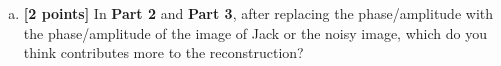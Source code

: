 \documentclass[11pt]{article}
\begin{document}
\begin{enumerate}[(a)]

\newpage

\item \textbf{[2 points]}
In \textbf{Part 2} and \textbf{Part 3}, after replacing the phase/amplitude with the phase/amplitude of the image of Jack or the noisy image, which do you think contributes more to the reconstruction?


\end{enumerate}
\end{document}
